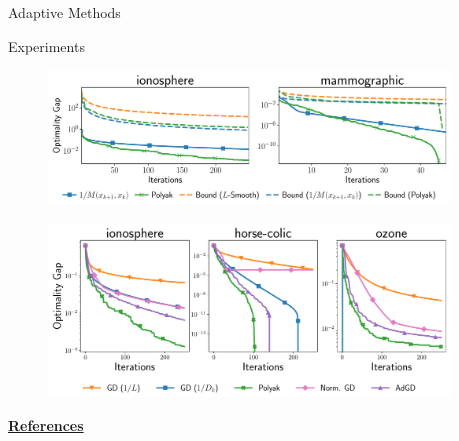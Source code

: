 \documentclass[12pt, usenames, dvipsnames]{beamer}
\newlength{\sepwidth}
\newlength{\colwidth}
\newcommand{\separatorcolumn}{\begin{column}{\sepwidth}\end{column}}
\begin{document}
\begin{frame}[t]
\begin{columns}[t]
\begin{column}{\colwidth}
\begin{block}{Adaptive Methods}
            \end{block}
            \vspace{-3ex}
            \begin{block}{Experiments}

                \begin{figure}[]
                    \centering
                    \includegraphics[width=1\textwidth]{assets/theoretical_rates.pdf}
                \end{figure}
                \vspace{-3ex}

                \begin{figure}[]
                    \centering
                    \includegraphics[width=1\textwidth]{assets/logistic_comparison.pdf}
                \end{figure}

                \vspace{-1ex}
                \underline{\textbf{References}}
                \footnotesize{
                    
                }
                

            \end{block}

        \end{column}

        \separatorcolumn
    \end{columns}
\end{frame}
\end{document}
